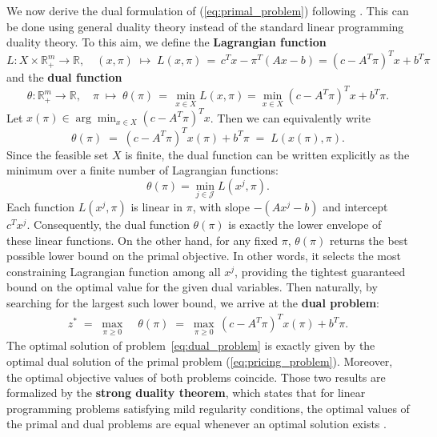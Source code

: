 \documentclass{book}
\theoremstyle{definition}
\numberwithin{algorithm_}{chapter}
\begin{document}
We now derive the dual formulation of (\ref{eq:primal_problem}) following \cite{briant2008}. This can be done using general duality theory instead of the standard linear programming duality theory.
To this aim, we define the \textbf{Lagrangian function}
\begin{equation} \label{eq:Lagrangian}
L: X \times \mathbb{R}_+^m \to \mathbb{R}, \quad
(x, \pi) \;\mapsto\; L(x, \pi) \, = \, c^T x - \pi^T (A x - b) = (c - A^T \pi)^T x + b^T \pi
\end{equation}
and the \textbf{dual function}
\begin{equation}
\theta: \mathbb{R}_+^m \to \mathbb{R}, \quad
\pi \;\mapsto\; \theta(\pi) \, = \, \min_{x \in X} L(x, \pi) = \min_{x \in X} (c - A^T \pi)^T x + b^T \pi.
\end{equation}
Let $x(\pi) \in \arg\min_{x \in X} (c - A^T \pi)^T x$. Then we can equivalently write
\begin{equation}
\theta(\pi) \; = \; (c - A^T \pi)^T x(\pi) + b^T \pi \; = \; L(x(\pi), \pi) .
\end{equation}
Since the feasible set $X$ is finite, the dual function can be written explicitly as the minimum over a finite number of Lagrangian functions:
\[
\theta(\pi) = \min_{j \in \mathcal{J}} L(x^j, \pi).
\]
Each function $L(x^j, \pi)$ is linear in $\pi$, with slope $-(A x^j - b)$ and intercept $c^T x^j$. Consequently, the dual function $\theta(\pi)$ is exactly the lower envelope of these linear functions. On the other hand, for any fixed $\pi$, $\theta(\pi)$ returns the best possible lower bound on the primal objective. In other words, it selects the most constraining Lagrangian function among all $x^j$, providing the tightest guaranteed bound on the optimal value for the given dual variables. Then naturally, by searching for the largest such lower bound, we arrive at the \textbf{dual problem}:
\begin{align} \label{eq:dual_problem}
z^* \; = \; \max_{\pi \ge 0} \; & \theta(\pi) \; = \; \max_{\pi \ge 0} \, (c - A^T \pi)^T x(\pi) + b^T \pi.
\end{align}
The optimal solution of problem~\eqref{eq:dual_problem} is exactly given by the optimal dual solution of the primal problem (\ref{eq:pricing_problem}). Moreover, the optimal objective values of both problems coincide. Those two results are formalized by the \textbf{strong duality theorem}, which states that for linear programming problems satisfying mild regularity conditions, the optimal values of the primal and dual problems are equal whenever an optimal solution exists \cite{nocedal2006numerical}.
\end{document}
